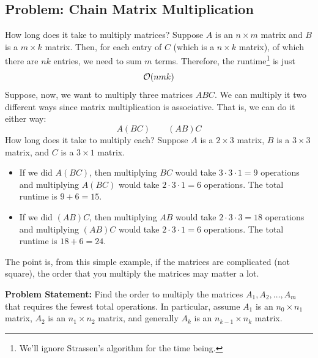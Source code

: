 \documentclass[letterpaper]{article}
\begin{document}
\subsection{Problem: Chain Matrix Multiplication}
How long does it take to multiply matrices? Suppose $A$ is an $n \times m$ matrix and $B$ is a $m \times k$ matrix. Then, for each entry of $C$ (which is a $n \times k$ matrix), of which there are $nk$ entries, we need to sum $m$ terms. Therefore, the runtime\footnote{We'll ignore Strassen's algorithm for the time being.} is just 
\[\mathcal{O}(nmk)\]
Suppose, now, we want to multiply three matrices $ABC$. We can multiply it two different ways since matrix multiplication is associative. That is, we can do it either way: 
\[A(BC) \qquad (AB)C\]
How long does it take to multiply each? Suppose $A$ is a $2 \times 3$ matrix, $B$ is a $3 \times 3$ matrix, and $C$ is a $3 \times 1$ matrix. 
\begin{itemize}
    \item If we did $A(BC)$, then multiplying $BC$ would take $3 \cdot 3 \cdot 1 = 9$ operations and multiplying $A(BC)$ would take $2 \cdot 3 \cdot 1 = 6$ operations. The total runtime is $9 + 6 = 15$. 
    \item If we did $(AB)C$, then multiplying $AB$ would take $2 \cdot 3 \cdot 3 = 18$ operations and multiplying $(AB)C$ would take $2 \cdot 3 \cdot 1 = 6$ operations. The total runtime is $18 + 6 = 24$. 
\end{itemize}
The point is, from this simple example, if the matrices are complicated (not square), the order that you multiply the matrices may matter a lot. 

\bigskip 

\textbf{Problem Statement:} Find the order to multiply the matrices $A_1, A_2, \dots, A_m$ that requires the fewest total operations. In particular, assume $A_1$ is an $n_0 \times n_1$ matrix, $A_2$ is an $n_1 \times n_2$ matrix, and generally $A_k$ is an $n_{k - 1} \times n_k$ matrix. 
\end{document}

